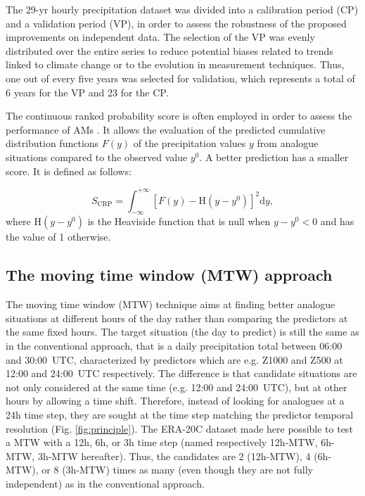 \documentclass[hess, manuscript]{copernicus}
\begin{document}
	The 29-yr hourly precipitation dataset was divided into a calibration period (CP) and a validation period (VP), in order to assess the robustness of the proposed improvements on independent data. The selection of the VP was evenly distributed over the entire series \citep{BenDaoud2010} to reduce potential biases related to trends linked to climate change or to the evolution in measurement techniques. Thus, one out of every five years was selected for validation, which represents a total of 6 years for the VP and 23 for the CP.
	
	The continuous ranked probability score \citep[CRPS,][]{Brown1974, Matheson1976, Hersbach2000} is often employed in order to assess the performance of AMs \citep[see, e.g.,][]{Bontron2004, Bontron2005, BenDaoud2008, Horton2012, Marty2012, Radanovics2013, Chardon2014, Junk2015, BenDaoud2016, Caillouet2016}. It allows the evaluation of the predicted cumulative distribution functions $F(y)$ of the precipitation values $y$ from analogue situations compared to the observed value $y^{0}$. A better prediction has a smaller score. It is defined as follows:
	
	\begin{equation}
	\label{eq:CRPS}
	S_{\text{CRP}} = \int_{-\infty}^{+\infty} \left[ F(y)-\text{H}(y-y^{0})\right]^{2} \text{d}y ,  
	\end{equation}
	where $\text{H}(y-y^{0})$ is the Heaviside function that is null when $y-y^{0}<0$ and has the value of 1 otherwise.
	
	
	\subsection{The moving time window (MTW) approach}
	\label{sec:mtw}
	
	The moving time window (MTW) technique aims at finding better analogue situations at different hours of the day rather than comparing the predictors at the same fixed hours. The target situation (the day to predict) is still the same as in the conventional approach, that is a daily precipitation total between 06:00 and 30:00~UTC, characterized by predictors which are e.g. Z1000 and Z500 at 12:00 and 24:00~UTC respectively. The difference is that candidate situations are not only considered at the same time (e.g. 12:00 and 24:00~UTC), but at other hours by allowing a time shift. Therefore, instead of looking for analogues at a 24h time step, they are sought at the time step matching the predictor temporal resolution (Fig. \ref{fig:principle}). The ERA-20C dataset made here possible to test a MTW with a 12h, 6h, or 3h time step (named respectively 12h-MTW, 6h-MTW, 3h-MTW hereafter). Thus, the candidates are 2 (12h-MTW), 4 (6h-MTW), or 8 (3h-MTW) times as many (even though they are not fully independent) as in the conventional approach.
	
\end{document}
